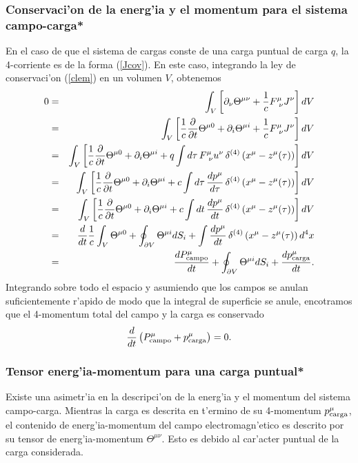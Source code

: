 \subsubsection{Conservaci'on de la energ'ia y el momentum para el sistema
campo-carga*}

En el caso de que el sistema de cargas conste de una carga puntual de carga $q$,
la 4-corriente es de la forma (\ref{Jcov}). En este caso, integrando la ley de
conservaci'on (\ref{clem}) en un volumen $V$, obtenemos
\begin{eqnarray}
0&=&\int_V \left[ \partial_\nu \Theta^{\mu\nu}+\frac{1}{c} F^\mu_{\
\nu}J^\nu\right]  dV \\
&=&\int_V \left[\frac{1}{c} \frac{\partial}{\partial t} \Theta^{\mu
0}+\partial_i \Theta^{\mu i}+\frac{1}{c} F^\mu_{\ \nu}J^\nu\right]  dV \\
&=&\int_V \left[\frac{1}{c} \frac{\partial}{\partial t} \Theta^{\mu
0}+\partial_i \Theta^{\mu i}+q\int d\tau\,  F^\mu_{\
\nu}u^\nu\,\delta^{(4)}\left(x^\mu-z^\mu(\tau)\right)\right]  dV \\
&=&\int_V \left[\frac{1}{c} \frac{\partial}{\partial t} \Theta^{\mu
0}+\partial_i \Theta^{\mu i}+c\int d\tau\,
\frac{dp^\mu}{d\tau}\,\delta^{(4)}\left(x^\mu-z^\mu(\tau)\right)\right]  dV \\
&=&\int_V \left[\frac{1}{c} \frac{\partial}{\partial t} \Theta^{\mu
0}+\partial_i \Theta^{\mu i}+c\int dt\,
\frac{dp^\mu}{dt}\,\delta^{(4)}\left(x^\mu-z^\mu(\tau)\right)\right]  dV
\\
&=&\frac{d}{dt}\frac{1}{c}\int_V  \Theta^{\mu 0}+\oint_{\partial V}\Theta^{\mu
i}dS_i+\int \frac{dp^\mu}{dt}\,\delta^{(4)}\left(x^\mu-z^\mu(\tau)\right)  d^4x
\\
&=&\frac{dP^\mu_{\rm campo}}{dt}+\oint_{\partial V}\Theta^{\mu
i}dS_i+\frac{dp^\mu_{\rm carga}}{dt}.
\end{eqnarray}
Integrando sobre todo el espacio y asumiendo que los campos se anulan
suficientemente r'apido de modo que la integral de superficie se anule,
encotramos que el 4-momentum total del campo y la carga es conservado
\begin{equation}
\frac{d}{dt}\left( P^\mu_{\rm campo}+p^\mu_{\rm carga}\right) =0.
\end{equation}

\subsubsection{Tensor energ'ia-momentum para una carga puntual*}
Existe una asimetr'ia en la descripci'on de la energ'ia y el momentum del
sistema
campo-carga. Mientras  la carga es descrita en t'ermino de su 4-momentum
$p^\mu_{\rm carga}$, el contenido de energ'ia-momentum del campo
electromagn'etico es descrito por su tensor de energ'ia-momentum
$\Theta^{\mu\nu}$. Esto es debido al car'acter puntual de la carga considerada.

